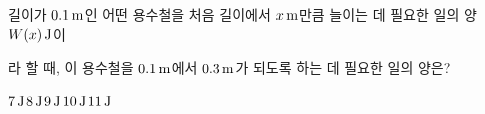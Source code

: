 길이가 $0.1\mkern3mu \mathrm{m}$인 어떤 용수철을 처음 길이에서 $x\mkern3mu \mathrm{m}$만큼 늘이는 데 필요한 일의 양 $W(x)\mkern3mu \mathrm{J}$이\par\smallskip{}\par\smallskip\noindent 라 할 때, 이 용수철을 $0.1\mkern3mu \mathrm{m}$에서 $0.3\mkern3mu \mathrm{m}$가 되도록 하는 데 필요한 일의 양은? 
\begin{choices32}{$7\mkern3mu \mathrm{J}$}{$8\mkern3mu \mathrm{J}$}{$9\mkern3mu \mathrm{J}$}{$10\mkern3mu \mathrm{J}$}{$11\mkern3mu \mathrm{J}$}\end{choices32}
